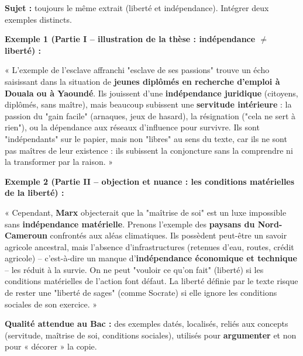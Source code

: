 \documentclass[11pt]{article}
\begin{document}
\begin{exoresolu}
\textbf{Sujet :} toujours le même extrait (liberté et indépendance). Intégrer deux exemples distincts.

\tcblower
\textbf{Exemple 1 (Partie I -- illustration de la thèse : indépendance $\neq$ liberté) :}

« L'exemple de l'esclave affranchi "esclave de ses passions" trouve un écho saisissant dans la situation de \textbf{jeunes diplômés en recherche d'emploi à Douala ou à Yaoundé}. Ils jouissent d'une \textbf{indépendance juridique} (citoyens, diplômés, sans maître), mais beaucoup subissent une \textbf{servitude intérieure} : la passion du "gain facile" (arnaques, jeux de hasard), la résignation ("cela ne sert à rien"), ou la dépendance aux réseaux d'influence pour survivre. Ils sont "indépendants" sur le papier, mais non "libres" au sens du texte, car ils ne sont pas maîtres de leur existence : ils subissent la conjoncture sans la comprendre ni la transformer par la raison. »

\textbf{Exemple 2 (Partie II -- objection et nuance : les conditions matérielles de la liberté) :}

« Cependant, \textbf{Marx} objecterait que la "maîtrise de soi" est un luxe impossible sans \textbf{indépendance matérielle}. Prenons l'exemple des \textbf{paysans du Nord-Cameroun} confrontés aux aléas climatiques. Ils possèdent peut-être un savoir agricole ancestral, mais l'absence d'infrastructures (retenues d'eau, routes, crédit agricole) -- c'est-à-dire un manque d'\textbf{indépendance économique et technique} -- les réduit à la survie. On ne peut "vouloir ce qu'on fait" (liberté) si les conditions matérielles de l'action font défaut. La liberté définie par le texte risque de rester une "liberté de sages" (comme Socrate) si elle ignore les conditions sociales de son exercice. »

\textbf{Qualité attendue au Bac :} des exemples datés, localisés, reliés aux concepts (servitude, maîtrise de soi, conditions sociales), utilisés pour \textbf{argumenter} et non pour « décorer » la copie.
\end{exoresolu}
\end{document}
